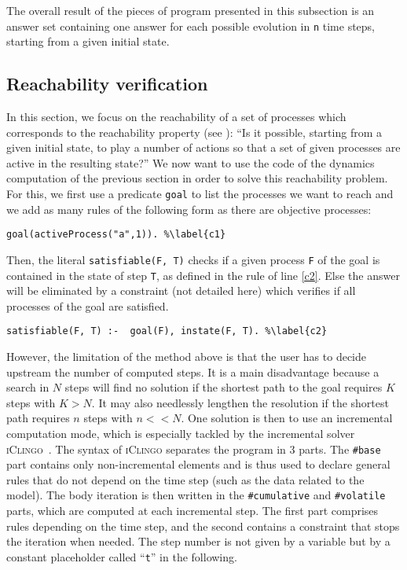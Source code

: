 The overall result of the pieces of program presented in this subsection
is an answer set containing one answer for each
possible evolution in \texttt{n} time steps,
starting from a given initial state.

\subsection{Reachability verification}
In this section, we focus on the reachability of a set of processes which corresponds to the reachability property (see ):
``Is it possible, starting from a given initial state, to play a number of actions so that a set of given processes are active in the resulting state?''
We now want to use the code of the dynamics computation of the previous section in order to solve this reachability problem.
For this, we first use a predicate \texttt{goal} to list the processes we want to reach and we add as many rules of the following form as there are objective processes:
\begin{lstlisting}
goal(activeProcess("a",1)). %\label{c1}
\end{lstlisting}
Then, the literal \texttt{satisfiable(F, T)} 
checks if a given process \texttt{F} of the goal
is contained in the state of step \texttt{T},
as defined in the rule of line \ref{c2}.
Else the answer will be eliminated by a constraint (not detailed here) which verifies if all processes of the goal are satisfied.
\begin{lstlisting}
satisfiable(F, T) :-  goal(F), instate(F, T). %\label{c2}
\end{lstlisting}

However, the limitation of the method above is that the user has to decide upstream
the number of computed steps.
It is a main disadvantage because a search in $N$ steps will find no solution
if the shortest path to the goal requires $K$ steps with $K > N$.
It may also needlessly lengthen the resolution if the shortest path requires $n$ steps with $n << N$.
One solution is then to use an incremental computation mode,
which is especially tackled by the incremental solver \textsc{iClingo}~\cite{gebser2008user}.
The syntax of \textsc{iClingo} separates the program in 3 parts.
The \texttt{\#base} part contains only non-incremental elements
and is thus used to declare general rules
that do not depend on the time step (such as the data related to the model).
The body iteration is then written in the
\texttt{\#cumulative} and \texttt{\#volatile} parts,
which are computed at each incremental step.
The first part comprises rules depending on the time step,
and the second contains a constraint that stops the iteration when needed.
The step number is not given by a variable but by a constant placeholder
called ``\texttt{t}'' in the following.

